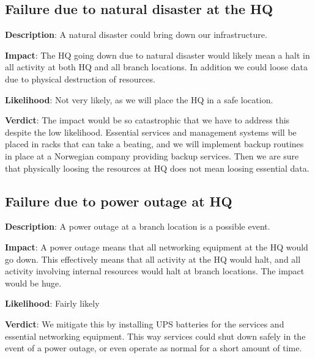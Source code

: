 \subsection{Failure due to natural disaster at the HQ}

\textbf{Description}: A natural disaster could bring down our infrastructure.

\textbf{Impact}: The HQ going down due to natural disaster would likely mean a halt in all activity at both HQ and all branch locations. In addition we could loose data due to physical destruction of resources.

\textbf{Likelihood}: Not very likely, as we will place the HQ in a safe location.

\textbf{Verdict}: The impact would be so catastrophic that we have to address this despite the low likelihood. Essential services and management systems will be placed in racks that can take a beating\cite{todo}, and we will implement backup routines in place at a Norwegian company providing backup services. Then we are sure that physically loosing the resources at HQ does not mean loosing essential data.

\subsection{Failure due to power outage at HQ}

\textbf{Description}: A power outage at a branch location is a possible event.

\textbf{Impact}: A power outage means that all networking equipment at the HQ would go down. This effectively means that all activity at the HQ would halt, and all activity involving internal resources would halt at branch locations. The impact would be huge.

\textbf{Likelihood}: Fairly likely

\textbf{Verdict}: We mitigate this by installing UPS batteries for the services and essential networking equipment. This way services could shut down safely in the event of a power outage, or even operate as normal for a short amount of time.


